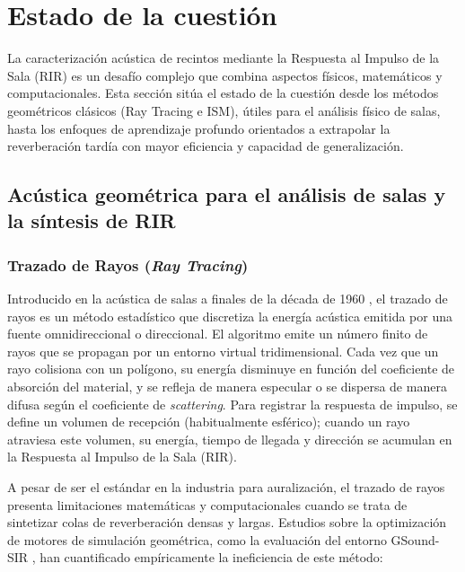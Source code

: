 
\chapter{Estado de la cuestión}

La caracterización acústica de recintos mediante la Respuesta al Impulso de la Sala (RIR) es un desafío complejo que combina aspectos físicos, matemáticos y computacionales. Esta sección sitúa el estado de la cuestión desde los métodos geométricos clásicos (Ray Tracing e ISM), útiles para el análisis físico de salas, hasta los enfoques de aprendizaje profundo orientados a extrapolar la reverberación tardía con mayor eficiencia y capacidad de generalización.

\section[Acústica geométrica]{Acústica geométrica para el análisis de salas y la síntesis de RIR}

\subsection{Trazado de Rayos (\textit{Ray Tracing})}

Introducido en la acústica de salas a finales de la década de 1960 \cite{Krokstad1968}, el trazado de rayos es un método estadístico que discretiza la energía acústica emitida por una fuente omnidireccional o direccional. El algoritmo emite un número finito de rayos que se propagan por un entorno virtual tridimensional. Cada vez que un rayo colisiona con un polígono, su energía disminuye en función del coeficiente de absorción del material, y se refleja de manera especular o se dispersa de manera difusa según el coeficiente de \textit{scattering}. Para registrar la respuesta de impulso, se define un volumen de recepción (habitualmente esférico); cuando un rayo atraviesa este volumen, su energía, tiempo de llegada y dirección se acumulan en la Respuesta al Impulso de la Sala (RIR).

A pesar de ser el estándar en la industria para auralización, el trazado de rayos presenta limitaciones matemáticas y computacionales  cuando se trata de sintetizar colas de reverberación densas y largas. Estudios  sobre la optimización de motores de simulación geométrica, como la evaluación del entorno GSound-SIR \cite{Zang2025GSoundSIR}, han cuantificado empíricamente la ineficiencia de este método:


